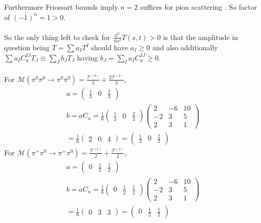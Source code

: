 ﻿\documentclass[12pt,a4paper]{article}
\begin{document}
Furthermore Friossart bounds imply $n=2$ suffices for pion scattering \cite{6}. So factor of $(-1)^{n}=1>0$. \\\\
So the only thing left to check for $\frac{\mathrm{d}^{2}}{\mathrm{~d} s^{2}} T(s, t)>0$ is that the amplitude in question being $T=\sum a_{I} T^{I}$ should have $a_{I} \geq 0$ and also additionally $\sum a_{I} C_{u}^{I J} T_{J} \equiv \sum_{J} b_{J} T_{J}$ having $b_{J}=\sum_{I} a_{I} C_{u}^{I J} \geq 0.$\\\\
For $\mathcal{M}\left(\pi^{0} \pi^{0} \rightarrow \pi^{0} \pi^{0}\right)=\frac{\mathcal{T}^{(0)}}{3}+\frac{2 \mathcal{T}^{(2)}}{3}$,
$$
\begin{array}{l}
a=\left(\begin{array}{lll}
\frac{1}{3} & 0 & \frac{2}{3}
\end{array}\right) \\
b=a C_{u}=\frac{1}{6}\left(\begin{array}{lll}
\frac{1}{3} & 0 & \frac{2}{3}
\end{array}\right)\left(\begin{array}{ccc}
2 & -6 & 10 \\
-2 & 3 & 5 \\
2 & 3 & 1
\end{array}\right) \\
=\frac{1}{6}\left(\begin{array}{lll}
2 & 0 & 4
\end{array}\right) =\left(\begin{array}{lll}
\frac{1}{3} & 0 & \frac{2}{3}
\end{array}\right) 
\end{array}
$$
For $\mathcal{M}\left(\pi^{+} \pi^{0} \rightarrow \pi^{+} \pi^{0}\right)=\frac{\mathcal{T}^{(1)}}{2}+\frac{\mathcal{T}^{(2)}}{2}$,
$$
\begin{array}{l}
a=\left(\begin{array}{lll}
0 & \frac{1}{2} & \frac{1}{2}
\end{array}\right) \\
b=a C_{u}=\frac{1}{6}\left(\begin{array}{lll}
0 & \frac{1}{2} & \frac{1}{2}
\end{array}\right)\left(\begin{array}{ccc}
2 & -6 & 10 \\
-2 & 3 & 5 \\
2 & 3 & 1
\end{array}\right) \\
=\frac{1}{6}\left(\begin{array}{lll}
0 & 3 & 3
\end{array}\right) =\left(\begin{array}{lll}
0 & \frac{1}{2} & \frac{1}{2}
\end{array}\right) 
\end{array}
$$
\end{document}
